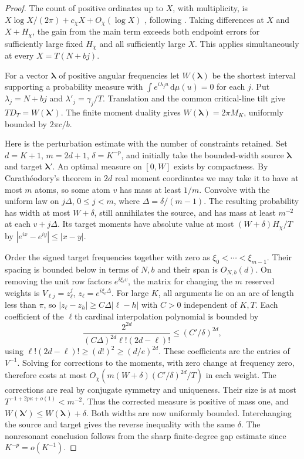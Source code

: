 \documentclass[11pt,letterpaper]{article}
\theoremstyle{remark}\newtheorem{remark}[theorem]{Remark}
\newcommand{\rd}{\,\mathrm{d}}
\begin{document}
\begin{proof}
The count of positive ordinates up to $X$, with multiplicity, is
$X\log X/(2\pi)+c_\chi X+O_\chi(\log X)$
\cite[(3.1)]{FSZ}, following \cite[(1.6)]{rvM}. Taking differences at $X$ and $X+H_\chi$, the gain from the main term exceeds both endpoint errors for sufficiently large fixed $H_\chi$ and all sufficiently large $X$. This applies simultaneously at every $X=T(N+bj)$.

For a vector $\boldsymbol\lambda$ of positive angular frequencies let $W(\boldsymbol\lambda)$ be the shortest interval supporting a probability measure with $\int e^{i\lambda_j u}\rd\mu(u)=0$ for each $j$. Put $\lambda_j=N+bj$ and $\lambda'_j=\gamma_j/T$. Translation and the common critical-line tilt give $TD_T=W(\boldsymbol\lambda')$.
The finite moment duality gives $W(\boldsymbol\lambda)=2\pi M_K$, uniformly bounded by $2\pi c/b$.

Here is the perturbation estimate with the number of constraints retained. Set $d=K+1$, $m=2d+1$, $\delta=K^{-p}$, and initially take the bounded-width source $\boldsymbol\lambda$ and target $\boldsymbol\lambda'$. An optimal measure on $[0,W]$ exists by compactness. By Carath\'eodory's theorem in $2d$ real moment coordinates we may take it to have at most $m$ atoms, so some atom $v$ has mass at least $1/m$. Convolve with the uniform law on $j\Delta$, $0\le j<m$, where $\Delta=\delta/(m-1)$. The resulting probability has width at most $W+\delta$, still annihilates the source, and has mass at least $m^{-2}$ at each $v+j\Delta$. Its target moments have absolute value at most $(W+\delta)H_\chi/T$ by $|e^{ix}-e^{iy}|\le|x-y|$.

Order the signed target frequencies together with zero as $\xi_0<\cdots<\xi_{m-1}$. Their spacing is bounded below in terms of $N,b$ and their span is $O_{N,b}(d)$. On removing the unit row factors $e^{i\xi_\ell v}$, the matrix for changing the $m$ reserved weights is $V_{\ell j}=z_\ell^j$, $z_\ell=e^{i\xi_\ell\Delta}$. For large $K$, all arguments lie on an arc of length less than $\pi$, so
$|z_\ell-z_h|\ge C\Delta |\ell-h|$ with $C>0$ independent of $K,T$. Each coefficient of the $\ell$th cardinal interpolation polynomial is bounded by
\[
 \frac{2^{2d}}{(C\Delta)^{2d}\ell!(2d-\ell)!}
 \le (C'/\delta)^{2d},
\]
using $\ell!(2d-\ell)!\ge(d!)^2\ge(d/e)^{2d}$. These coefficients are the entries of $V^{-1}$. Solving for corrections to the moments, with zero change at frequency zero, therefore costs at most $O_\chi(m(W+\delta)(C'/\delta)^{2d}/T)$ in each weight. The corrections are real by conjugate symmetry and uniqueness. Their size is at most $T^{-1+2p\kappa+o(1)}<m^{-2}$. Thus the corrected measure is positive of mass one, and $W(\boldsymbol\lambda')\le W(\boldsymbol\lambda)+\delta$. Both widths are now uniformly bounded. Interchanging the source and target gives the reverse inequality with the same $\delta$. The nonresonant conclusion follows from the sharp finite-degree gap estimate since $K^{-p}=o(K^{-1})$.
\end{proof}
\end{document}
